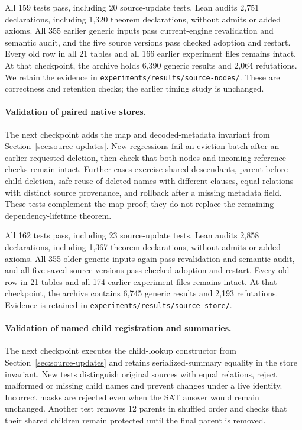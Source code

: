 \documentclass[11pt,a4paper]{article}
\numberwithin{equation}{section}
\theoremstyle{plain}
\theoremstyle{definition}
\theoremstyle{remark}
\begin{document}
All 159 tests pass, including 20 source-update tests. Lean audits 2,751 declarations, including 1,320 theorem declarations, without admits or added axioms. All 355 earlier generic inputs pass current-engine revalidation and semantic audit, and the five source versions pass checked adoption and restart. Every old row in all 21 tables and all 166 earlier experiment files remains intact. At that checkpoint, the archive holds 6,390 generic results and 2,064 refutations. We retain the evidence in \texttt{experiments/results/source-nodes/}. These are correctness and retention checks; the earlier timing study is unchanged.

\paragraph{Validation of paired native stores.}
The next checkpoint adds the map and decoded-metadata invariant from Section~\ref{sec:source-updates}. New regressions fail an eviction batch after an earlier requested deletion, then check that both nodes and incoming-reference checks remain intact. Further cases exercise shared descendants, parent-before-child deletion, safe reuse of deleted names with different clauses, equal relations with distinct source provenance, and rollback after a missing metadata field. These tests complement the map proof; they do not replace the remaining dependency-lifetime theorem.

All 162 tests pass, including 23 source-update tests. Lean audits 2,858 declarations, including 1,367 theorem declarations, without admits or added axioms. All 355 older generic inputs again pass revalidation and semantic audit, and all five saved source versions pass checked adoption and restart. Every old row in 21 tables and all 174 earlier experiment files remains intact. At that checkpoint, the archive contains 6,745 generic results and 2,193 refutations. Evidence is retained in \texttt{experiments/results/source-store/}.

\paragraph{Validation of named child registration and summaries.}
The next checkpoint executes the child-lookup constructor from Section~\ref{sec:source-updates} and retains serialized-summary equality in the store invariant. New tests distinguish original sources with equal relations, reject malformed or missing child names and prevent changes under a live identity. Incorrect masks are rejected even when the SAT answer would remain unchanged. Another test removes 12 parents in shuffled order and checks that their shared children remain protected until the final parent is removed.
\end{document}
